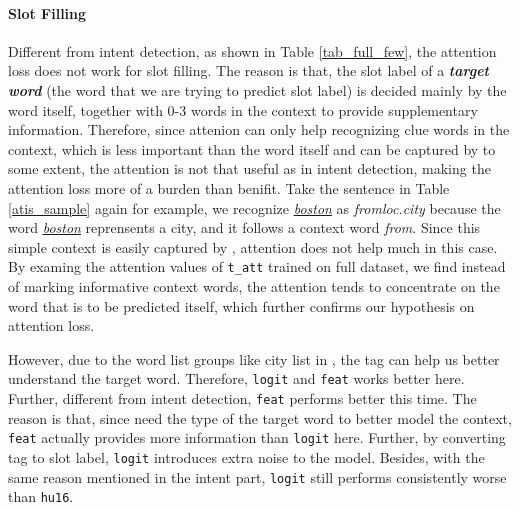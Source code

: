 \paragraph{Slot Filling}

Different from intent detection, as shown in Table \ref{tab_full_few}, the attention loss does not work for slot filling.
The reason is that, the slot label of a \textbf{\emph{target word}} (the word that we are trying to predict slot label) is decided mainly by the word itself, together with 0-3 words in the context to provide supplementary information.
Therefore, since attenion can only help recognizing clue words in the context, which is less important than the word itself and can be captured by \BLSTM to some extent, the attention is not that useful as in intent detection, making the attention loss more of a burden than benifit.
Take the sentence in Table \ref{atis_sample} again for example, we recognize \textsl{\underline{boston}} as \emph{fromloc.city} because the word \textsl{\underline{boston}} reprensents a city, and it follows a context word \emph{from}. Since this simple context is easily captured by \BLSTM, attention does not help much in this case.
By examing the attention values of \texttt{t\_att} trained on full dataset,
we find instead of marking informative context words, the attention tends to concentrate on the word that is to be predicted itself, which further confirms our hypothesis on attention loss.

However, due to the word list groups like city list in \RE, the \RE tag can help us better understand the target word. 
Therefore, \texttt{logit} and \texttt{feat} works better here.
Further, different from intent detection, \texttt{feat} performs better this time.
The reason is that, since \BLSTM need the type of the target word to better model the context, \texttt{feat} actually provides more information than \texttt{logit} here.
Further, by converting \RE tag to slot label, \texttt{logit} introduces extra noise to the model.
Besides, with the same reason mentioned in the intent part, \texttt{logit} still performs consistently worse than \texttt{hu16}.

